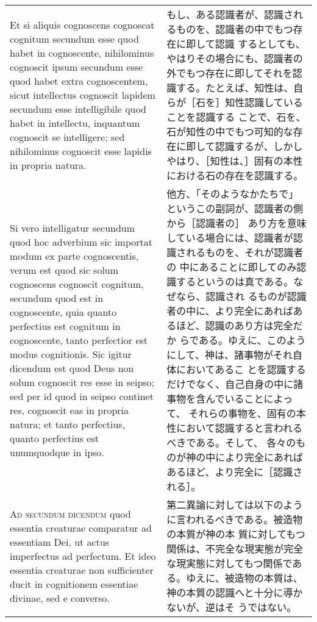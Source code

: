 \documentclass[10pt]{jsarticle} %
\begin{document}
\begin{longtable}{p{21em}p{21em}}
Et si aliquis cognoscens cognoscat cognitum secundum esse
quod habet in cognoscente, nihilominus cognoscit ipsum secundum esse
quod habet extra cognoscentem, sicut intellectus cognoscit lapidem
secundum esse intelligibile quod habet in intellectu, inquantum
cognoscit se intelligere; sed nihilominus cognoscit esse lapidis in
propria natura. 


&

もし、ある認識者が、認識されるものを、認識者の中でもつ存在に即して認識
するとしても、やはりその場合にも、認識者の外でもつ存在に即してそれを認
識する。たとえば、知性は、自らが［石を］知性認識していることを認識する
ことで、石を、石が知性の中でもつ可知的な存在に即して認識するが、しかし
やはり、［知性は、］固有の本性における石の存在を認識する。

\\



Si vero intelligatur secundum quod hoc adverbium sic importat modum ex
parte cognoscentis, verum est quod sic solum cognoscens cognoscit
cognitum, secundum quod est in cognoscente, quia quanto perfectius est
cognitum in cognoscente, tanto perfectior est modus cognitionis. Sic
igitur dicendum est quod Deus non solum cognoscit res esse in seipso;
sed per id quod in seipso continet res, cognoscit eas in propria
natura; et tanto perfectius, quanto perfectius est unumquodque in
ipso.

&

他方、「そのようなかたちで」というこの副詞が、認識者の側から［認識者の］
あり方を意味している場合には、認識者が認識されるものを、それが認識者の
中にあることに即してのみ認識するというのは真である。なぜなら、認識され
るものが認識者の中に、より完全にあればあるほど、認識のあり方は完全だか
らである。ゆえに、このようにして、神は、諸事物がそれ自体においてあるこ
とを認識するだけでなく、自己自身の中に諸事物を含んでいることによって、
それらの事物を、固有の本性において認識すると言われるべきである。そして、
各々のものが神の中により完全にあればあるほど、より完全に［認識される］。

\\


{\scshape Ad secundum dicendum} quod essentia creaturae
comparatur ad essentiam Dei, ut actus imperfectus ad perfectum. Et ideo
essentia creaturae non sufficienter ducit in cognitionem essentiae
divinae, sed e converso.


&

第二異論に対しては以下のように言われるべきである。被造物の本質が神の本
質に対してもつ関係は、不完全な現実態が完全な現実態に対してもつ関係であ
る。ゆえに、被造物の本質は、神の本質の認識へと十分に導かないが、逆はそ
うではない。


\end{longtable}
\end{document}
